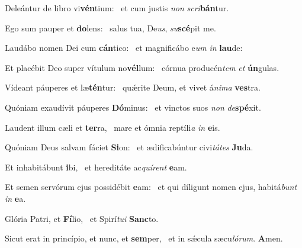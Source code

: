 \item Deleántur de libro vi\textbf{vén}tium:~\psstar{} et cum justis \textit{non} \textit{scri}\textbf{bán}tur.

\item Ego sum pauper et \textbf{do}lens:~\psstar{} salus tua, De\textit{us}, \textit{su}\textbf{scé}pit me.

\item Laudábo nomen Dei cum \textbf{cán}tico:~\psstar{} et magnificábo e\textit{um} \textit{in} \textbf{lau}de:

\item Et placébit Deo super vítulum no\textbf{vél}lum:~\psstar{} córnua producén\textit{tem} \textit{et} \textbf{ún}gulas.

\item Vídeant páuperes et læ\textbf{tén}tur:~\psstar{} quǽrite Deum, et vivet á\textit{nima} \textbf{ves}tra.

\item Quóniam exaudívit páuperes \textbf{Dó}minus:~\psstar{} et vinctos suos \textit{non} \textit{de}\textbf{spé}xit.

\item Laudent illum cæli et \textbf{ter}ra,~\psstar{} mare et ómnia reptíli\textit{a} \textit{in} \textbf{e}is.

\item Quóniam Deus salvam fáciet \textbf{Si}on:~\psstar{} et ædificabúntur civi\textit{tátes} \textbf{Ju}da.

\item Et inhabitábunt \textbf{i}bi,~\psstar{} et hereditáte ac\textit{quírent} \textbf{e}am.

\item Et semen servórum ejus possidébit \textbf{e}am:~\psstar{} et qui díligunt nomen ejus, habitá\textit{bunt} \textit{in} \textbf{e}a.

\item Glória Patri, et \textbf{Fí}lio,~\psstar{} et Spirí\textit{tui} \textbf{Sanc}to.

\item Sicut erat in princípio, et nunc, et \textbf{sem}per,~\psstar{} et in sǽcula sæcu\textit{lórum}. \textbf{A}men.
